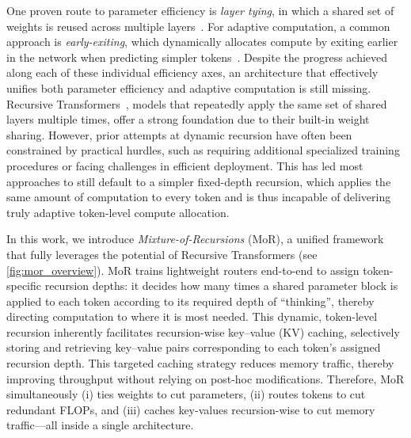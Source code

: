 One proven route to parameter efficiency is \textit{layer tying}, in which a shared set of weights is reused across multiple layers~\citep{dehghani2018universal, lan2019albert0, takase2021lessons, gholami2023generative, bae2024relaxed}.
For adaptive computation, a common approach is \textit{early-exiting}, which dynamically allocates compute by exiting  earlier in the network when predicting simpler tokens~\citep{elhoushi2024layerskip, schuster2022confident, Elbayad2020Depth-Adaptive, bae-etal-2023-fast}.
Despite the progress achieved along each of these individual efficiency axes, an architecture that effectively unifies both parameter efficiency and adaptive computation is still missing.
Recursive Transformers~\citep{bae2024relaxed, fan2024looped, giannou2023looped, yang2023looped, saunshi2025reasoning, geiping2025scaling, aleksandrov2025abbie}, models that repeatedly apply the same set of shared layers multiple times, offer a strong foundation due to their built-in weight sharing.
However, prior attempts at dynamic recursion have often been constrained by practical hurdles, such as requiring additional specialized training procedures or facing challenges in efficient deployment. This has led most approaches to still default to a simpler fixed-depth recursion, which applies the same amount of computation to every token and is thus incapable of delivering truly adaptive token-level compute allocation.


In this work, we introduce \textit{Mixture-of-Recursions} (MoR), a unified framework that fully leverages the potential of Recursive Transformers (see \autoref{fig:mor_overview}).
MoR trains lightweight routers end-to-end to assign token-specific recursion depths: it decides how many times a shared parameter block is applied to each token according to its required depth of ``thinking'', thereby directing computation to where it is most needed. 
This dynamic, token-level recursion inherently facilitates recursion-wise key–value (KV) caching, selectively storing and retrieving key–value pairs corresponding to each token’s assigned recursion depth. This targeted caching strategy reduces memory traffic, thereby improving throughput without relying on post-hoc modifications.
Therefore, MoR simultaneously (i) ties weights to cut parameters, (ii) routes tokens to cut redundant FLOPs, and (iii) caches key-values recursion-wise to cut memory traffic—all inside a single architecture.



